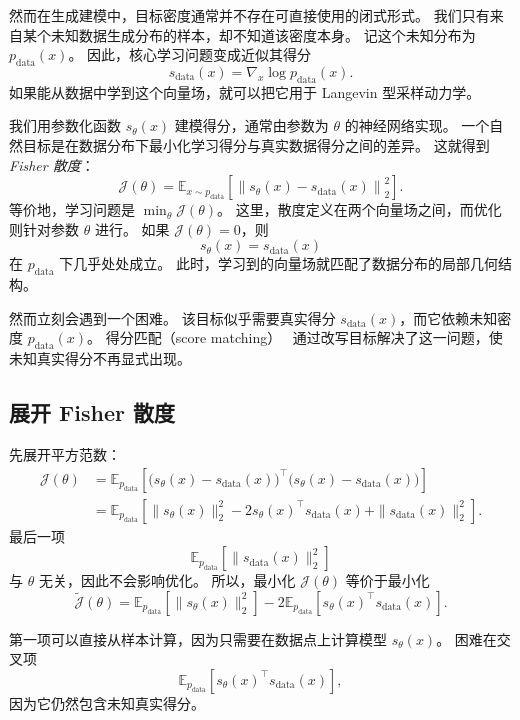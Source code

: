 然而在生成建模中，目标密度通常并不存在可直接使用的闭式形式。
我们只有来自某个未知数据生成分布的样本，却不知道该密度本身。
记这个未知分布为 $p_{\text{data}}(x)$。
因此，核心学习问题变成近似其得分
\[
s_{\text{data}}(x)
=
\nabla_x \log p_{\text{data}}(x).
\]
如果能从数据中学到这个向量场，就可以把它用于 Langevin 型采样动力学。

我们用参数化函数 $s_\theta(x)$ 建模得分，通常由参数为 $\theta$ 的神经网络实现。
一个自然目标是在数据分布下最小化学习得分与真实数据得分之间的差异。
这就得到\emph{Fisher 散度}：
\[
\mathcal{J}(\theta)
=
\mathbb{E}_{x\sim p_{\text{data}}}
\left[
\left\|
s_\theta(x)-s_{\text{data}}(x)
\right\|_2^2
\right].
\]
等价地，学习问题是 $\min_\theta \mathcal{J}(\theta)$。
这里，散度定义在两个向量场之间，而优化则针对参数 $\theta$ 进行。
如果 $\mathcal{J}(\theta)=0$，则
\[
s_\theta(x)=s_{\text{data}}(x)
\]
在 $p_{\text{data}}$ 下几乎处处成立。
此时，学习到的向量场就匹配了数据分布的局部几何结构。

然而立刻会遇到一个困难。
该目标似乎需要真实得分 $s_{\text{data}}(x)$，而它依赖未知密度 $p_{\text{data}}(x)$。
得分匹配（score matching）~\cite{hyvarinen2005estimation} 通过改写目标解决了这一问题，使未知真实得分不再显式出现。

\subsection{展开 Fisher 散度}

先展开平方范数：
\[
\begin{aligned}
\mathcal{J}(\theta)
&=
\mathbb{E}_{p_{\text{data}}}
\left[
\bigl(s_\theta(x)-s_{\text{data}}(x)\bigr)^\top
\bigl(s_\theta(x)-s_{\text{data}}(x)\bigr)
\right] \\[4pt]
&=
\mathbb{E}_{p_{\text{data}}}
\left[
\|s_\theta(x)\|_2^2
-
2s_\theta(x)^\top s_{\text{data}}(x)
+
\|s_{\text{data}}(x)\|_2^2
\right].
\end{aligned}
\]
最后一项
\[
\mathbb{E}_{p_{\text{data}}}
\left[
\|s_{\text{data}}(x)\|_2^2
\right]
\]
与 $\theta$ 无关，因此不会影响优化。
所以，最小化 $\mathcal{J}(\theta)$ 等价于最小化
\[
\tilde{\mathcal{J}}(\theta)
=
\mathbb{E}_{p_{\text{data}}}
\left[
\|s_\theta(x)\|_2^2
\right]
-
2
\mathbb{E}_{p_{\text{data}}}
\left[
s_\theta(x)^\top s_{\text{data}}(x)
\right].
\]

第一项可以直接从样本计算，因为只需要在数据点上计算模型 $s_\theta(x)$。
困难在交叉项
\[
\mathbb{E}_{p_{\text{data}}}
\left[
s_\theta(x)^\top s_{\text{data}}(x)
\right],
\]
因为它仍然包含未知真实得分。

